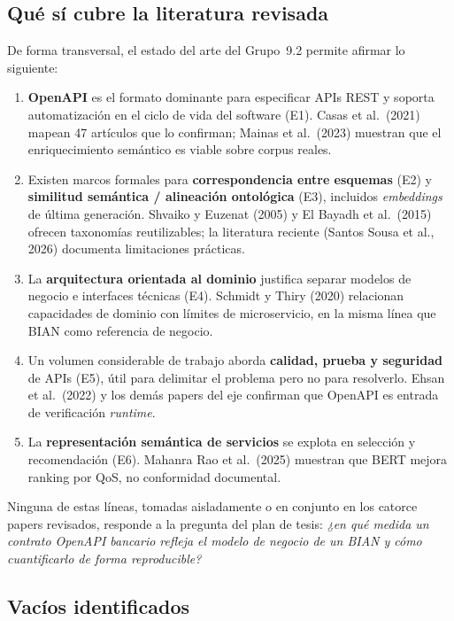 \subsection{Qué sí cubre la literatura revisada}

De forma transversal, el estado del arte del Grupo~9.2 permite afirmar lo siguiente:

\begin{enumerate}
  \item \textbf{OpenAPI} es el formato dominante para especificar APIs REST y soporta automatización
        en el ciclo de vida del software (E1). Casas et al.\ (2021) mapean 47 artículos que lo
        confirman; Mainas et al.\ (2023) muestran que el enriquecimiento semántico es viable sobre
        corpus reales.
  \item Existen marcos formales para \textbf{correspondencia entre esquemas} (E2) y \textbf{similitud
        semántica / alineación ontológica} (E3), incluidos \textit{embeddings} de última generación.
        Shvaiko y Euzenat (2005) y El Bayadh et al.\ (2015) ofrecen taxonomías reutilizables; la
        literatura reciente (Santos Sousa et al., 2026) documenta limitaciones prácticas.
  \item La \textbf{arquitectura orientada al dominio} justifica separar modelos de negocio e
        interfaces técnicas (E4). Schmidt y Thiry (2020) relacionan capacidades de dominio con
        límites de microservicio, en la misma línea que BIAN como referencia de negocio.
  \item Un volumen considerable de trabajo aborda \textbf{calidad, prueba y seguridad} de APIs (E5),
        útil para delimitar el problema pero no para resolverlo. Ehsan et al.\ (2022) y los demás
        papers del eje confirman que OpenAPI es entrada de verificación \textit{runtime}.
  \item La \textbf{representación semántica de servicios} se explota en selección y recomendación
        (E6). Mahanra Rao et al.\ (2025) muestran que BERT mejora ranking por QoS, no conformidad
        documental.
\end{enumerate}

Ninguna de estas líneas, tomadas aisladamente o en conjunto en los catorce papers revisados,
responde a la pregunta del plan de tesis: \textit{¿en qué medida un contrato OpenAPI bancario refleja
el modelo de negocio de un \ServiceDomain{} BIAN y cómo cuantificarlo de forma reproducible?}

\subsection{Vacíos identificados}

